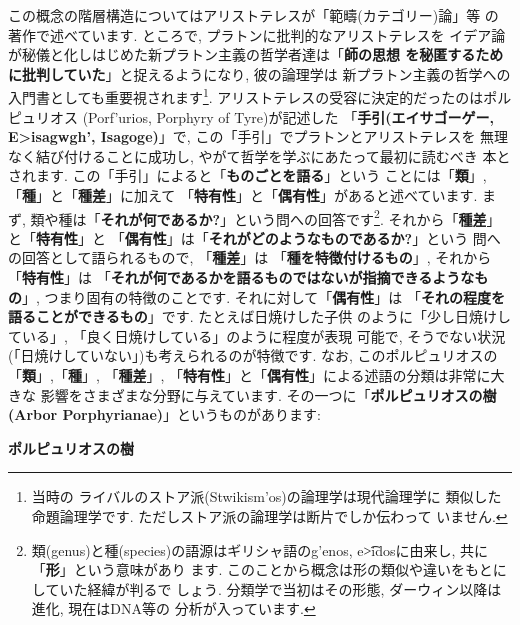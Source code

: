 \documentclass[b5j,8pt,twocolumn]{ltjsarticle}
\newcommand{\textgreek}[1]{\begingroup\fontencoding{LGR}\selectfont#1\endgroup}
\begin{document}
この概念の階層構造についてはアリストテレスが「範疇(カテゴリー)論」等
の著作で述べています. ところで, プラトンに批判的なアリストテレスを
イデア論が秘儀と化しはじめた新プラトン主義の哲学者達は「\textbf{師の思想
を秘匿するために批判していた}」と捉えるようになり, 彼の論理学は
新プラトン主義の哲学への入門書としても重要視されます\footnote{当時の
ライバルのストア派(\textgreek{Stwikism'os})の論理学は現代論理学に
類似した命題論理学です. ただしストア派の論理学は断片でしか伝わって
いません.}. アリストテレスの受容に決定的だったのはポルピュリオス
(\textgreek{Porf'urios}, Porphyry of Tyre)が記述した
「\textbf{手引(エイサゴーゲー, \textgreek{E>isagwgh'},
 Isagoge\cite{Barnes})}」で, この「手引」でプラトンとアリストテレスを
無理なく結び付けることに成功し, やがて哲学を学ぶにあたって最初に読むべき
本とされます. この「手引」によると「\textbf{ものごとを語る}」という
ことには「\textbf{類}」, 「\textbf{種}」と「\textbf{種差}」に加えて
「\textbf{特有性}」と「\textbf{偶有性}」があると述べています. まず,
 類や種は「\textbf{それが何であるか?}」という問への回答です\footnote{
類(genus)と種(species)の語源はギリシャ語の\textgreek{g'enos}, 
 \textgreek{e\t{>i}dos}に由来し, 共に「\textbf{形}」という意味があり
ます. このことから概念は形の類似や違いをもとにしていた経緯が判るで
しょう. 分類学で当初はその形態, ダーウィン以降は進化, 現在はDNA等の
分析が入っています.}. それから「\textbf{種差}」と「\textbf{特有性}」と
「\textbf{偶有性}」は「\textbf{それがどのようなものであるか?}」という
問への回答として語られるもので, 「\textbf{種差}」は
「\textbf{種を特徴付けるもの}」, それから「\textbf{特有性}」は
「\textbf{それが何であるかを語るものではないが指摘できるようなもの}」,
 つまり固有の特徴のことです. それに対して「\textbf{偶有性}」は
「\textbf{それの程度を語ることができるもの}」です. たとえば日焼けした子供
のように「少し日焼けしている」, 「良く日焼けしている」のように程度が表現
可能で, そうでない状況(「日焼けしていない」)も考えられるのが特徴です. なお,
 このポルピュリオスの「\textbf{類}」,「\textbf{種}」, 「\textbf{種差}」,
 「\textbf{特有性}」と「\textbf{偶有性}」による述語の分類は非常に大きな
影響をさまざまな分野に与えています. その一つに「\textbf{ポルピュリオスの樹
(Arbor Porphyrianae)}」というものがあります:


\begin{itembox}[c]{\textbf{ポルピュリオスの樹}}
{\tiny
{}
}
\end{itembox}
\end{document}

